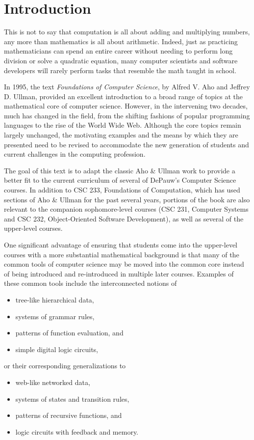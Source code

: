
\chapter{Introduction}
 This is not to say that computation is all about adding and multiplying numbers, any more than mathematics is all about arithmetic. Indeed, just as practicing mathematicians can spend an entire career without needing to perform long division or solve a quadratic equation, many computer scientists and software developers will rarely perform tasks that resemble the math taught in school.

In 1995, the text \textit{Foundations of Computer Science}, by Alfred V. Aho and Jeffrey D. Ullman\cite{aho1994foundations}, provided an excellent introduction to a broad range of topics at the mathematical core of computer science. However, in the intervening two decades, much has changed in the field, from the shifting fashions of popular programming languages to the rise of the World Wide Web. Although the core topics remain largely unchanged, the motivating examples and the means by which they are presented need to be revised to accommodate the new generation of students and current challenges in the computing profession.

The goal of this text is to adapt the classic Aho \& Ullman work to provide a better fit to the current curriculum of several of DePauw's Computer Science courses. In addition to CSC 233, Foundations of Computation, which has used sections of Aho \& Ullman for the past several years, portions of the book are also relevant to the companion sophomore-level courses (CSC 231, Computer Systems and CSC 232, Object-Oriented Software Development), as well as several of the upper-level courses.

One significant advantage of ensuring that students come into the upper-level courses with a more substantial mathematical background is that many of the common tools of computer science may be moved into the common core instead of being introduced and re-introduced in multiple later courses. Examples of these common tools include the interconnected notions of
\begin{itemize}
\item tree-like hierarchical data,
\item systems of grammar rules,
\item patterns of function evaluation, and
\item simple digital logic circuits,
\end{itemize}
or their corresponding generalizations to
\begin{itemize}
\item web-like networked data,
\item systems of states and transition rules,
\item patterns of recursive functions, and
\item logic circuits with feedback and memory.
\end{itemize}


